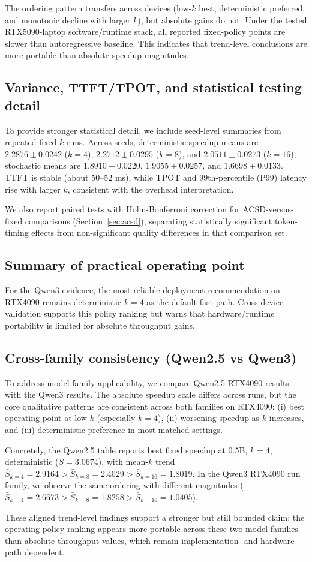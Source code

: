 The ordering pattern transfers across devices (low-$k$ best,
deterministic preferred, and monotonic decline with larger $k$),
but absolute gains do not.
Under the tested RTX5090-laptop software/runtime stack, all reported
fixed-policy points are slower than autoregressive baseline.
This indicates that trend-level
conclusions are more portable than absolute speedup magnitudes.

\subsection{Variance, TTFT/TPOT, and statistical testing detail}

To provide stronger statistical detail, we include seed-level summaries from
repeated fixed-$k$ runs.
Across seeds, deterministic speedup means are
$2.2876\pm0.0242$ ($k{=}4$), $2.2712\pm0.0295$ ($k{=}8$), and
$2.0511\pm0.0273$ ($k{=}16$); stochastic means are
$1.8910\pm0.0220$, $1.9055\pm0.0257$, and $1.6698\pm0.0133$.
TTFT is stable (about 50--52 ms), while TPOT and 99th-percentile (P99)
latency rise with larger
$k$, consistent with the overhead interpretation.

We also report paired tests with Holm-Bonferroni correction for ACSD-versus-fixed
comparisons (Section~\ref{sec:acsd}), separating statistically
significant token-timing effects from non-significant quality differences in
that comparison set.

\subsection{Summary of practical operating point}

For the Qwen3 evidence, the most reliable deployment recommendation on
RTX4090 remains deterministic $k{=}4$ as the default fast path.
Cross-device validation supports this policy ranking but warns that
hardware/runtime portability is limited for absolute throughput gains.

\subsection{Cross-family consistency (Qwen2.5 vs Qwen3)}

To address model-family applicability, we compare Qwen2.5 RTX4090
results with the Qwen3 results.
The absolute speedup scale differs across runs, but the core qualitative
patterns are consistent across both families on RTX4090:
(i) best operating point at low $k$ (especially $k{=}4$),
(ii) worsening speedup as $k$ increases, and
(iii) deterministic preference in most matched settings.

Concretely, the Qwen2.5 table reports best fixed speedup at
0.5B, $k{=}4$, deterministic ($S{=}3.0674$), with mean-$k$ trend
$\bar{S}_{k=4}=2.9164 > \bar{S}_{k=8}=2.4029 > \bar{S}_{k=16}=1.8019$.
In the Qwen3 RTX4090 run family, we observe the same ordering with
different magnitudes ($\bar{S}_{k=4}=2.6673 > \bar{S}_{k=8}=1.8258 >
\bar{S}_{k=16}=1.0405$).

These aligned trend-level findings support a stronger but still bounded claim:
the operating-policy ranking appears more portable across these two model
families than absolute throughput values, which remain implementation- and
hardware-path dependent.
